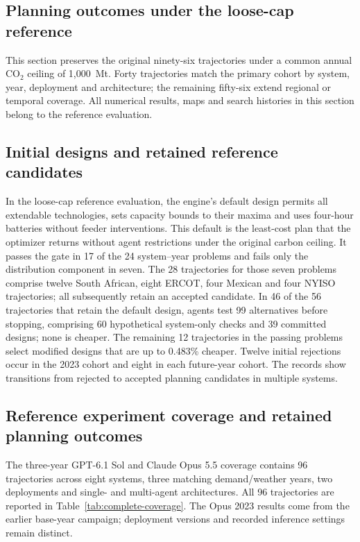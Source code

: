 \documentclass[pdflatex,sn-nature]{sn-jnl}
\begin{document}
\begin{appendices}
\section{Planning outcomes under the loose-cap reference}\label{app:loose-cap-results}
\setcounter{figure}{0}

This section preserves the original ninety-six trajectories under a common annual CO$_2$ ceiling of 1,000~Mt. Forty trajectories match the primary cohort by system, year, deployment and architecture; the remaining fifty-six extend regional or temporal coverage. All numerical results, maps and search histories in this section belong to the reference evaluation.

\subsection{Initial designs and retained reference candidates}

In the loose-cap reference evaluation, the engine's default design permits all extendable technologies, sets capacity bounds to their maxima and uses four-hour batteries without feeder interventions. This default is the least-cost plan that the optimizer returns without agent restrictions under the original carbon ceiling. It passes the gate in 17 of the 24 system--year problems and fails only the distribution component in seven. The 28 trajectories for those seven problems comprise twelve South African, eight ERCOT, four Mexican and four NYISO trajectories; all subsequently retain an accepted candidate. In 46 of the 56 trajectories that retain the default design, agents test 99 alternatives before stopping, comprising 60 hypothetical system-only checks and 39 committed designs; none is cheaper. The remaining 12 trajectories in the passing problems select modified designs that are up to 0.483\% cheaper. Twelve initial rejections occur in the 2023 cohort and eight in each future-year cohort. The records show transitions from rejected to accepted planning candidates in multiple systems.

\subsection{Reference experiment coverage and retained planning outcomes}\label{sec:reference-complete-results}
The three-year GPT-6.1 Sol and Claude Opus 5.5 coverage contains 96 trajectories across eight systems, three matching demand/weather years, two deployments and single- and multi-agent architectures. All 96 trajectories are reported in Table~\ref{tab:complete-coverage}. The Opus 2023 results come from the earlier base-year campaign; deployment versions and recorded inference settings remain distinct.


\end{appendices}
\end{document}
